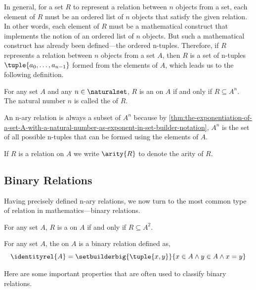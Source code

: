 \vspace{0.3cm}
\noindent
In general, for a set \( R \) to represent a relation between \( n \) objects from a set,
each element of \( R \) must be an ordered list of \( n \) objects that satisfy the given relation.
In other words, each element of \( R \) must be a mathematical construct that implements
the notion of an ordered list of \( n \) objects. But such a mathematical construct has already been defined---the ordered n-tuples.
Therefore, if \( R \) represents a relation between \( n \) objects from a set \( A \), then \( R \) is
a set of n-tuples \( \tuple{a_{0}, \dots, a_{n-1}} \) formed from the elements of \( A \), which
leads us to the following definition.

\begin{dfn}
    \label{dfn:n-ary-relation-on-a-set}
    For any set \( A \) and any \( n \in \naturalset \), \( R \) is an  on \( A \) if and only if \( R \subseteq A^{n} \).
    The natural number \( n \) is called the  of \( R \).
\end{dfn}

\begin{rem}
    An n-ary relation is always a subset of \( A^{n} \) because by
    \cref{thm:the-exponentiation-of-a-set-A-with-a-natural-number-as-exponent-in-set-builder-notation},
    \( A^{n} \) is the set of all possible n-tuples that can be formed using the elements of \( A \).
\end{rem}

\begin{notation}[Arity]
     \label{notation:arity-of-n-ary-relations}
    If \( R \) is a relation on \( A \) we write \( \arity{R} \) to denote the arity of \( R \).
\end{notation}

\subsection{Binary Relations}
Having precisely defined n-ary relations, we now turn to the most common type of relation in mathematics---binary relations.
\begin{dfn}
    \label{dfn:binary-relation-on-a-set}
    For any set \( A \), \( R \) is a  on \( A \) if and only if
    \( R \subseteq A^{2} \).
\end{dfn}

\begin{dfn}
    \label{dfn:identity-relation}
    For any set \( A \), the  on \( A \) is a binary relation defined as,
    \begin{equation*}
        \identityrel{A} = \setbuilderbig{\tuple{x,y}}{x \in A \land y \in A \land x = y}
    \end{equation*}
\end{dfn}
\noindent
Here are some important properties that are often used to classify binary relations.

